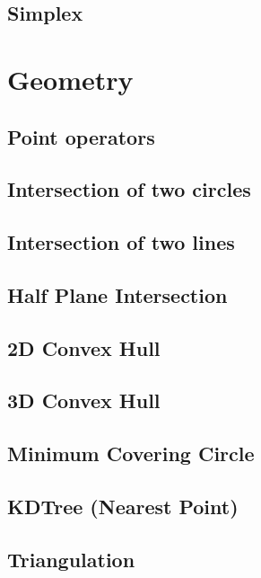 \documentclass[a4paper,10pt,twocolumn,oneside]{article}
\begin{document}
\subsection{Simplex}


\section{Geometry}
\subsection{Point operators}

\subsection{Intersection of two circles}

\subsection{Intersection of two lines}

\subsection{Half Plane Intersection}

\subsection{2D Convex Hull}

\subsection{3D Convex Hull}

\subsection{Minimum Covering Circle}

\subsection{KDTree (Nearest Point)}

\subsection{Triangulation}

\end{document}
